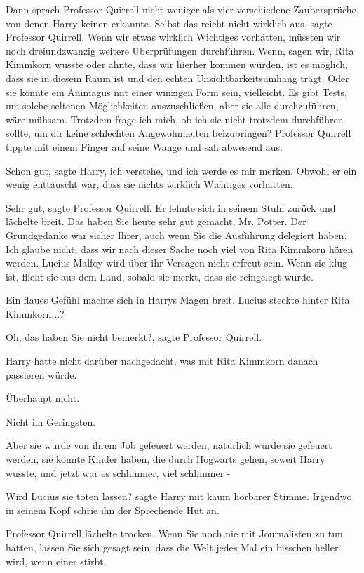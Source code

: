 Dann sprach Professor Quirrell nicht weniger als vier verschiedene
Zaubersprüche, von denen Harry keinen erkannte. \glqq{}Selbst das reicht nicht
wirklich aus\grqq{}, sagte Professor Quirrell. \glqq{}Wenn wir etwas wirklich
Wichtiges vorhätten, müssten wir noch dreiundzwanzig weitere Überprüfungen
durchführen. Wenn, sagen wir, Rita Kimmkorn wusste oder ahnte, dass wir hierher
kommen würden, ist es möglich, dass sie in diesem Raum ist und den echten
Unsichtbarkeitsumhang trägt. Oder sie könnte ein Animagus mit einer winzigen
Form sein, vielleicht. Es gibt Tests, um solche seltenen Möglichkeiten
auszuschließen, aber sie alle durchzuführen, wäre mühsam. Trotzdem frage ich
mich, ob ich sie nicht trotzdem durchführen sollte, um dir keine schlechten
Angewohnheiten beizubringen?\grqq{} Professor Quirrell tippte mit einem Finger
auf seine Wange und sah abwesend aus.

\glqq{}Schon gut\grqq{}, sagte Harry, \glqq{}ich verstehe, und ich werde es mir
merken.\grqq{} Obwohl er ein wenig enttäuscht war, dass sie nichts wirklich
Wichtiges vorhatten.

\glqq{}Sehr gut\grqq{}, sagte Professor Quirrell. Er lehnte sich in seinem Stuhl
zurück und lächelte breit. \glqq{}Das haben Sie heute sehr gut gemacht, Mr.
Potter. Der Grundgedanke war sicher Ihrer, auch wenn Sie die Ausführung
delegiert haben. Ich glaube nicht, dass wir nach dieser Sache noch viel von Rita
Kimmkorn hören werden. Lucius Malfoy wird über ihr Versagen nicht erfreut sein.
Wenn sie klug ist, flieht sie aus dem Land, sobald sie merkt, dass sie
reingelegt wurde.\grqq{}

Ein flaues Gefühl machte sich in Harrys Magen breit. \glqq{}Lucius steckte
hinter Rita Kimmkorn...?\grqq{}

\glqq{}Oh, das haben Sie nicht bemerkt?\grqq{}, sagte Professor Quirrell.

Harry hatte nicht darüber nachgedacht, was mit Rita Kimmkorn danach passieren
würde.

Überhaupt nicht.

Nicht im Geringsten.

Aber sie würde von ihrem Job gefeuert werden, natürlich würde sie gefeuert
werden, sie könnte Kinder haben, die durch Hogwarts gehen, soweit Harry wusste,
und jetzt war es schlimmer, viel schlimmer -

\glqq{}Wird Lucius sie töten lassen?\grqq{} sagte Harry mit kaum hörbarer
Stimme. Irgendwo in seinem Kopf schrie ihn der Sprechende Hut an.

Professor Quirrell lächelte trocken. \glqq{}Wenn Sie noch nie mit Journalisten
zu tun hatten, lassen Sie sich gesagt sein, dass die Welt jedes Mal ein bisschen
heller wird, wenn einer stirbt.\grqq{}

